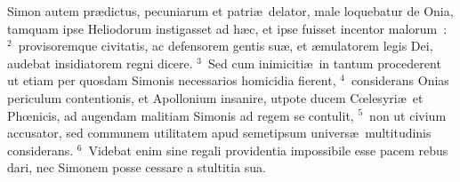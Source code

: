 \bchapter
\lettrine[lines=3,image=true,loversize=0.05,lraise=-0.03]{S}{}imon autem pr\ae dictus, pecuniarum et patri\ae\ delator, male loquebatur de Onia, tamquam ipse Heliodorum instigasset ad h\ae c, et ipse fuisset incentor malorum~:
${}^{2}$~provisoremque civitatis, ac defensorem gentis su\ae , et \ae mulatorem legis Dei, audebat insidiatorem regni dicere.
${}^{3}$~Sed cum inimiciti\ae\ in tantum procederent ut etiam per quosdam Simonis necessarios homicidia fierent,
${}^{4}$~considerans Onias periculum contentionis, et Apollonium insanire, utpote ducem Cœlesyri\ae\ et Phœnicis, ad augendam malitiam Simonis ad regem se contulit,
${}^{5}$~non ut civium accusator, sed communem utilitatem apud semetipsum univers\ae\ multitudinis considerans.
${}^{6}$~Videbat enim sine regali providentia impossibile esse pacem rebus dari, nec Simonem posse cessare a stultitia sua.


